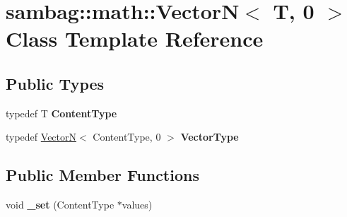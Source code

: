 \hypertarget{classsambag_1_1math_1_1_vector_n_3_01_t_00_010_01_4}{
\section{sambag::math::VectorN$<$ T, 0 $>$ Class Template Reference}
\label{classsambag_1_1math_1_1_vector_n_3_01_t_00_010_01_4}
}
\subsection*{Public Types}
\begin{DoxyCompactItemize}
\item 
\hypertarget{classsambag_1_1math_1_1_vector_n_3_01_t_00_010_01_4_a063c1981c0bd74e61aefdea58fc7c79c}{
typedef T {\bfseries ContentType}}
\label{classsambag_1_1math_1_1_vector_n_3_01_t_00_010_01_4_a063c1981c0bd74e61aefdea58fc7c79c}

\item 
\hypertarget{classsambag_1_1math_1_1_vector_n_3_01_t_00_010_01_4_ae5e88d05547026977575c23b084262c0}{
typedef \hyperlink{classsambag_1_1math_1_1_vector_n}{VectorN}$<$ ContentType, 0 $>$ {\bfseries VectorType}}
\label{classsambag_1_1math_1_1_vector_n_3_01_t_00_010_01_4_ae5e88d05547026977575c23b084262c0}

\end{DoxyCompactItemize}
\subsection*{Public Member Functions}
\begin{DoxyCompactItemize}
\item 
\hypertarget{classsambag_1_1math_1_1_vector_n_3_01_t_00_010_01_4_ad65603076600cc857470d8e53901b9f0}{
void {\bfseries \_\-set} (ContentType $\ast$values)}
\label{classsambag_1_1math_1_1_vector_n_3_01_t_00_010_01_4_ad65603076600cc857470d8e53901b9f0}

\end{DoxyCompactItemize}
